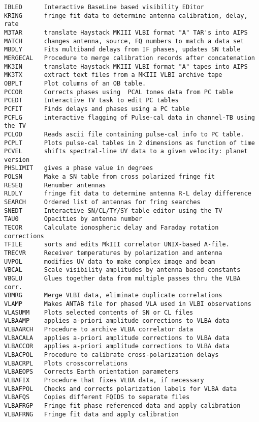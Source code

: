 \begin{verbatim}
IBLED      Interactive BaseLine based visibility EDitor
KRING      fringe fit data to determine antenna calibration, delay, rate
M3TAR      translate Haystack MKIII VLBI format "A" TAR's into AIPS
MATCH      changes antenna, source, FQ numbers to match a data set
MBDLY      Fits multiband delays from IF phases, updates SN table
MERGECAL   Procedure to merge calibration records after concatenation
MK3IN      translate Haystack MKIII VLBI format "A" tapes into AIPS
MK3TX      extract text files from a MKIII VLBI archive tape
OBPLT      Plot columns of an OB table.
PCCOR      Corrects phases using  PCAL tones data from PC table
PCEDT      Interactive TV task to edit PC tables
PCFIT      Finds delays and phases using a PC table
PCFLG      interactive flagging of Pulse-cal data in channel-TB using the TV
PCLOD      Reads ascii file containing pulse-cal info to PC table.
PCPLT      Plots pulse-cal tables in 2 dimensions as function of time
PCVEL      shifts spectral-line UV data to a given velocity: planet version
PHSLIMIT   gives a phase value in degrees
POLSN      Make a SN table from cross polarized fringe fit
RESEQ      Renumber antennas
RLDLY      fringe fit data to determine antenna R-L delay difference
SEARCH     Ordered list of antennas for fring searches
SNEDT      Interactive SN/CL/TY/SY table editor using the TV
TAU0       Opacities by antenna number
TECOR      Calculate ionospheric delay and Faraday rotation corrections
TFILE      sorts and edits MkIII correlator UNIX-based A-file.
TRECVR     Receiver temperatures by polarization and antenna
UVPOL      modifies UV data to make complex image and beam
VBCAL      Scale visibility amplitudes by antenna based constants
VBGLU      Glues together data from multiple passes thru the VLBA corr.
VBMRG      Merge VLBI data, eliminate duplicate correlations
VLAMP      Makes ANTAB file for phased VLA used in VLBI observations
VLASUMM    Plots selected contents of SN or CL files
VLBAAMP    applies a-priori amplitude corrections to VLBA data
VLBAARCH   Procedure to archive VLBA correlator data
VLBACALA   applies a-priori amplitude corrections to VLBA data
VLBACCOR   applies a-priori amplitude corrections to VLBA data
VLBACPOL   Procedure to calibrate cross-polarization delays
VLBACRPL   Plots crosscorrelations
VLBAEOPS   Corrects Earth orientation parameters
VLBAFIX    Procedure that fixes VLBA data, if necessary
VLBAFPOL   Checks and corrects polarization labels for VLBA data
VLBAFQS    Copies different FQIDS to separate files
VLBAFRGP   Fringe fit phase referenced data and apply calibration
VLBAFRNG   Fringe fit data and apply calibration

\end{verbatim}
